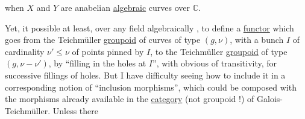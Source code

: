 when $X$ and $Y$ are anabelian \uline{algebraic}
curves over $\mathbb C$.

Yet, it   possible at
least, over any field algebraically ,
to define a \uline{functor} which goes from the
Teichmüller \uline{groupoid} of
curves of type $(g,\nu)$,  with a
bunch  $I$ of cardinality $\nu'\leq\nu$ of
points pinned by $I$, to the Teichmüller \uline{groupoid}
of type $(g,\nu-\nu')$,
by ``filling in the holes at $I$'', 
with  obvious  of
transitivity, for successive fillings of
holes. But I have difficulty seeing
how to include it in a
corresponding notion of ``inclusion
morphisms'', which could be composed
with the morphisms already
available in the \uline{category} (not groupoid !)
of Galois-Teichmüller. Unless there
